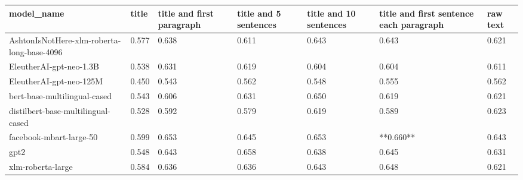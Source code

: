 \begin{tabular}{lllllll}
\toprule
                                model\_name & title & title and first paragraph & title and 5 sentences & title and 10 sentences & title and first sentence each paragraph & raw text \\
\midrule
AshtonIsNotHere-xlm-roberta-long-base-4096 & 0.577 &                     0.638 &                 0.611 &                  0.643 &                                   0.643 &    0.621 \\
                   EleutherAI-gpt-neo-1.3B & 0.538 &                     0.631 &                 0.619 &                  0.604 &                                   0.604 &    0.611 \\
                   EleutherAI-gpt-neo-125M & 0.450 &                     0.543 &                 0.562 &                  0.548 &                                   0.555 &    0.562 \\
              bert-base-multilingual-cased & 0.543 &                     0.606 &                 0.631 &                  0.650 &                                   0.619 &    0.621 \\
        distilbert-base-multilingual-cased & 0.528 &                     0.592 &                 0.579 &                  0.619 &                                   0.589 &    0.623 \\
                   facebook-mbart-large-50 & 0.599 &                     0.653 &                 0.645 &                  0.653 &                               **0.660** &    0.643 \\
                                      gpt2 & 0.548 &                     0.643 &                 0.658 &                  0.638 &                                   0.645 &    0.631 \\
                         xlm-roberta-large & 0.584 &                     0.636 &                 0.636 &                  0.643 &                                   0.648 &    0.621 \\
\bottomrule
\end{tabular}

